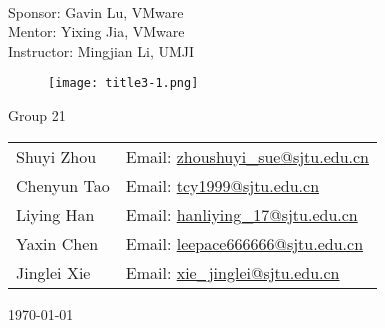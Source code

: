 \documentclass[11pt,a4paper]{article}
\begin{document}
\begin{titlepage}
	\begin{center}
		\begin{onehalfspace}
			\hrulefill
			\begin{center}
			\end{center}
			\hrulefill
			\vspace*{1cm}
			\begin{center}
				\begin{Large}
				\end{Large}\\[1cm]
				Sponsor: Gavin Lu, VMware \\
				Mentor: Yixing Jia, VMware \\
				Instructor: Mingjian Li, UMJI \\[1cm]
				\begin{figure}[H]
				    \centering
	                \texttt{[image: title3-1.png]}
                \end{figure}
                \vspace*{1cm}
				Group 21\\
				\begin{table}[h]
					\centering
					\begin{tabular}{p{3cm}p{6cm}}
						Shuyi Zhou & Email: \href{mailto:zhoushuyi_sue@sjtu.edu.cn}{zhoushuyi\_sue@sjtu.edu.cn} \\
						Chenyun Tao & Email: \href{mailto:tcy1999@sjtu.edu.cn}{tcy1999@sjtu.edu.cn} \\ 
						Liying Han & Email: \href{mailto:hanliying_17@sjtu.edu.cn}{hanliying\_17@sjtu.edu.cn} \\
						Yaxin Chen & Email: \href{mailto:leepace666666@sjtu.edu.cn}{leepace666666@sjtu.edu.cn}\\
						Jinglei Xie & Email: \href{mailto:xie_jinglei@sjtu.edu.cn}{xie\_jinglei@sjtu.edu.cn}
					\end{tabular}
				\end{table}  
				\vspace*{0.5cm}
				\today
			\end{center}
		\end{onehalfspace}
	\end{center}
\end{titlepage}
\end{document}
